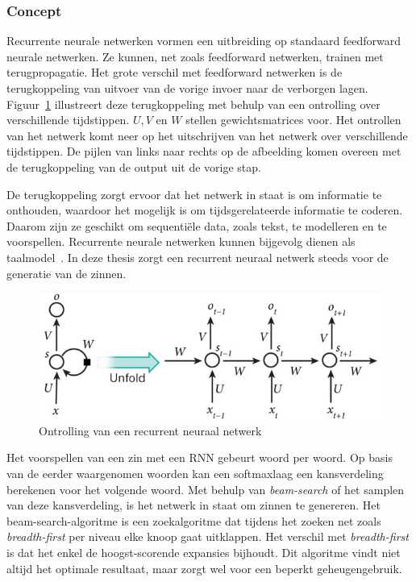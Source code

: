 \subsubsection{Concept}
\label{sec:rnnconcept}
Recurrente neurale netwerken vormen een uitbreiding op standaard feedforward neurale netwerken. Ze kunnen, net zoals feedforward netwerken, trainen met terugpropagatie. Het grote verschil met feedforward netwerken is de terugkoppeling van uitvoer van de vorige invoer naar de verborgen lagen. Figuur~\ref{fig:rnn} illustreert deze terugkoppeling met behulp van een ontrolling over verschillende tijdstippen. $U,V$ en $W$ stellen gewichtsmatrices voor. Het ontrollen van het netwerk komt neer op het uitschrijven van het netwerk over verschillende tijdstippen. De pijlen van links naar rechts op de afbeelding komen overeen met de terugkoppeling van de output uit de vorige stap.

De terugkoppeling zorgt ervoor dat het netwerk in staat is om informatie te onthouden, waardoor het mogelijk is om tijdsgerelateerde informatie te coderen. Daarom zijn ze geschikt om sequenti\"ele data, zoals tekst, te modelleren en te voorspellen. Recurrente neurale netwerken kunnen bijgevolg dienen als taalmodel~\cite{Mikolov2010}. In deze thesis zorgt een recurrent neuraal netwerk steeds voor de generatie van de zinnen.

\begin{figure}[tb]
    \centering
    \includegraphics[width=\linewidth]{Images/rnn.PNG}
    \caption[Ontrolling van een recurrent neuraal netwerk]{Ontrolling van een recurrent neuraal netwerk~\cite{RNNTutorial}}
    \label{fig:rnn}
\end{figure}

Het voorspellen van een zin met een RNN gebeurt woord per woord. Op basis van de eerder waargenomen woorden kan een softmaxlaag een kansverdeling berekenen voor het volgende woord. Met behulp van \emph{beam-search} of het samplen van deze kansverdeling, is het netwerk in staat om zinnen te genereren. Het beam-search-algoritme is een zoekalgoritme dat tijdens het zoeken net zoals \emph{breadth-first} per niveau elke knoop gaat uitklappen. Het verschil met \emph{breadth-first} is dat het enkel de hoogst-scorende expansies bijhoudt. Dit algoritme vindt niet altijd het optimale resultaat, maar zorgt wel voor een beperkt geheugengebruik.

